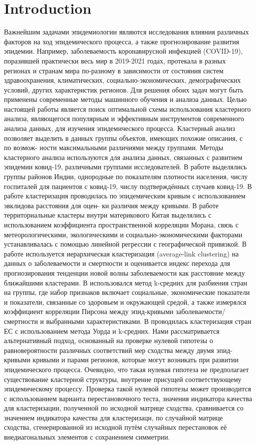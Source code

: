 \documentclass{article}
\begin{document}
\section{Introduction}
Важнейшим задачами эпидемиологии являются исследования влияния различных факторов на ход эпидемического процесса, а также прогнозирование развития эпидемии. Например, заболеваемость коронавирусной инфекцией (COVID-19), поразившей практически весь мир в 2019-2021 годах, протекала в разных регионах и странам мира по-разному в зависимости от состояния систем здравоохранения, климатических, социально-экономических, демографических условий, других характеристик регионов. Для решения обоих задач могут быть применены современные методы машинного обучения и анализа данных. Целью настоящей работы является поиск оптимальной схемы использования кластерного анализа, являющегося популярным и эффективным инструментов современного анализа данных, для изучения эпидемического процесса. Кластерный анализ позволяет выделить в данных группы объектов, имеющих похожие описания, с по возмож-
ности максимальными различиями между группами. 
Методы кластерного анализа используются для анализа данных, связанных с развитием эпидемии ковид-19, различными группами исследователей. В работе \cite{1} выделялись группы районов Индии, однородные по показателям плотности населения, числу госпиталей для пациентов с ковид-19, числу подтверждённых случаев ковид-19. В работе \cite{2}кластеризация проводилась по эпидемическим кривым с использованием эвклидова расстояния для оцен-
ки различия между кривыми. В работе \cite{3} территориальные кластеры внутри материкового Китая выделялись с использованием коэффициента пространственной корреляции Морана, связь с метеорологическими, экологическими и социально-экономическими факторами устанавливалась с помощью линейной регрессии с географической привязкой. В работе \cite{4} используется иерархическая кластеризация (average-link clustering) на данных о заболеваемости и смертности и оценивается индекс перехода для прогнозирования тенденции новой волны заболеваемости как расстояние между ближайшими кластерами. В \cite{5} использовался метод k-средних для разбиения стран на группы, где набор признаков включает социальные, экономические показатели и показатели, связанные со здоровьем и окружающей средой, а также измерялся коэффициент корреляции Пирсона между эпид-кривыми заболеваемости/смертности и выбранными характеристиками. В \cite{6} проводилась кластеризация стран ЕС с использованием метода Уорда и k-средних.
Нами рассматривается альтернативный подход, основанный на проверке нулевой гипотезы о равновероятности различных соответствий мер сходства между двумя эпид-кривыми кривыми и парами регионов, которые могут возникать при развитии эпидемического процесса.
Очевидно, что такая нулевая гипотеза не предполагает существование кластерной структуры, внутренне присущей соответствующему эпидемическому процессу. Проверка такой нулевой гипотезы может производится с использованием варианта перестановочного теста, значения индикатора качества для кластеризации, полученной по исходной матрице сходства, сравнивается со значением индикатора качества для кластеризаци, по случайной матрице сходства, сгенерированной из исходной путём случайных перестановок её внедиагональных
элементов с сохранением симметрии.
\end{document}
